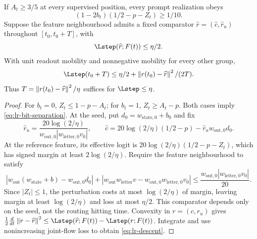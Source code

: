 \begin{lemma}
\label{lem:lr-readout-convergence}
If $A_t\ge3/5$ at every supervised position, every prompt realization obeys
\begin{equation}\label{eq:lr-bit-separation}
 (1-2b_t)(1/2-p-Z_t)\ge1/10.
\end{equation}
Suppose the feature neighbourhood admits a fixed comparator
$\widehat r=(\widehat c,\widehat r_u)$ throughout $[t_0,t_0+T]$, with
\begin{equation}\label{eq:lr-comparator}
 \Lstep(\widehat r;F(t))\le\eta/2.
\end{equation}
With unit readout mobility and nonnegative mobility for every other group,
\begin{equation}\label{eq:lr-descent}
 \Lstep(t_0+T)\le\eta/2+\LRnorm{r(t_0)-\widehat r}^2/(2T).
\end{equation}
Thus $T=\left\lVert r(t_0)-\widehat r\right\rVert^2/\eta$ suffices for $\Lstep\le\eta$.
\end{lemma}
\begin{proof}
For $b_t=0$, $Z_t\le1-p-A_t$; for $b_t=1$,
$Z_t\ge A_t-p$.  Both cases imply
\eqref{eq:lr-bit-separation}.
At the seed, put $d_0=w_{\mathrm{state},0}+b_0$ and fix
\[
 \widehat r_u=\frac{20\log(2/\eta)}{w_{\mathrm{out},0}|w_{\mathrm{letter},0}v_0|},\qquad
 \widehat c=20\log(2/\eta)(1/2-p)-\widehat r_uw_{\mathrm{out},0}d_0.
\]
At the reference feature, its effective logit is
$20\log(2/\eta)(1/2-p-Z_t)$, which has signed margin at least $2\log(2/\eta)$.
Require the feature neighbourhood to satisfy
\begin{equation}\label{eq:lr-comparator-stability}
 |w_{\mathrm{out}}(w_{\mathrm{state}}+b)-w_{\mathrm{out},0}d_0|+|w_{\mathrm{out}} {w_{\mathrm{letter}} v}-w_{\mathrm{out},0}{w_{\mathrm{letter},0}v_0}|
 \le\frac{w_{\mathrm{out},0}|{w_{\mathrm{letter},0}v_0}|}{20}.
\end{equation}
Since $|Z_t|\le1$, the perturbation costs at most $\log(2/\eta)$ of margin,
leaving margin at least $\log(2/\eta)$ and loss at most $\eta/2$.
This comparator depends only on the seed, not the routing hitting time.
Convexity in $r=(c,r_u)$ \citep[Sections~3.1.3, 3.1.5]{boyd2004convex} gives
$\frac12\frac{d}{dt}\LRnorm{r-\widehat r}^2
\le\Lstep(\widehat r;F(t))-\Lstep(r;F(t))$.
Integrate and use nonincreasing joint-flow loss to obtain \eqref{eq:lr-descent}.
\end{proof}

